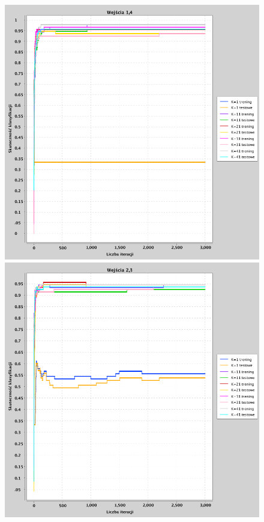 \documentclass[a4paper, portrait,11pt]{article}
\begin{document}
\begin{figure}[!htb]
  \begin{minipage}{0.33\textwidth}
    \centering
    \includegraphics[width=1\linewidth]{../data/classification4/1/derivatives/2_1,4.png}
    \caption{\label{fig:41_2_1,4derivative}}
  \end{minipage}
  \begin{minipage}{0.33\textwidth}
    \centering
    \includegraphics[width=1\linewidth]{../data/classification4/1/derivatives/2_2,3.png}

\end{minipage}
\end{figure}
\end{document}
